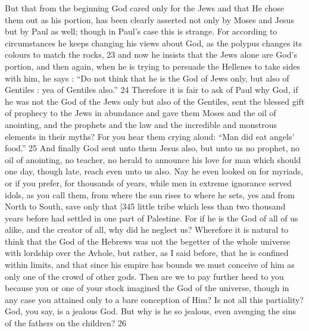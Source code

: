 But that from the beginning God cared only for the Jews and that He chose them out as his portion, has been clearly asserted not only by Moses and Jesus but by Paul as well; though in Paul's case this is strange. For according to circumstances he keeps changing his views about God, as the polypus changes its colours to match the rocks, 23 and now he insists that the Jews alone are God's portion, and then again, when he is trying to persuade the Hellenes to take sides with him, he says : ``Do not think that he is the God of Jews only, but also of Gentiles : yea of Gentiles also.''
24 Therefore it is fair to ask of Paul why God, if he was not the God of the Jews only but also of the Gentiles, sent the blessed gift of prophecy to the Jews in abundance and gave them Moses and the oil of anointing, and the prophets and the law and the incredible and monstrous elements in their myths? For you hear them crying aloud: ``Man did eat angels' food.''
25 And finally God sent unto them Jesus also, but unto us no prophet, no oil of anointing, no teacher, no herald to announce his love for man which should one day, though late, reach even unto us also. Nay he even looked on for
myriads, or if you prefer, for thousands of years, while men in extreme ignorance served idols, as you call them, from where the sun rises to where he sets, yes and from North to South, save only that
|345 little tribe which less than two thousand years before had settled in one part of Palestine. For if he is the God of all of us alike, and the creator of all, why did he neglect us? Wherefore it is natural to think that the God of the Hebrews was not the begetter of the whole universe with lordship over the Avhole, but rather, as I said before, that he is confined within limits, and that since his empire has bounds we must conceive of him as only one of the crowd of other gods. Then are we to pay further heed to you because you or one of your stock imagined the God of the universe, though in any case you attained only to a bare conception of Him? Is not all this partiality? God, you say, is a jealous God. But why is he so jealous, even avenging the sins of the fathers on the children?
26

